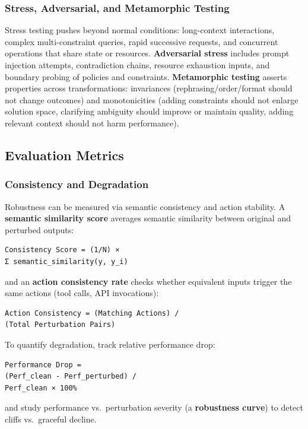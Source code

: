 \begin{TNtwocol}
\subsubsection*{Stress, Adversarial, and Metamorphic Testing}
Stress testing pushes beyond normal conditions: long-context interactions, complex multi-constraint queries, rapid successive requests, and concurrent operations that share state or resources. \textbf{Adversarial stress} includes prompt injection attempts, contradiction chains, resource exhaustion inputs, and boundary probing of policies and constraints. \textbf{Metamorphic testing} asserts properties across transformations: invariances (rephrasing/order/format should not change outcomes) and monotonicities (adding constraints should not enlarge solution space, clarifying ambiguity should improve or maintain quality, adding relevant context should not harm performance).

\subsection*{Evaluation Metrics}

\subsubsection*{Consistency and Degradation}
Robustness can be measured via semantic consistency and action stability. A \textbf{semantic similarity score} averages semantic similarity between original and perturbed outputs:
\begin{verbatim}
Consistency Score = (1/N) × 
Σ semantic_similarity(y, y_i)
\end{verbatim}
and an \textbf{action consistency rate} checks whether equivalent inputs trigger the same actions (tool calls, API invocations):
\begin{verbatim}
Action Consistency = (Matching Actions) / 
(Total Perturbation Pairs)
\end{verbatim}
To quantify degradation, track relative performance drop:
\begin{verbatim}
Performance Drop = 
(Perf_clean - Perf_perturbed) / 
Perf_clean × 100%
\end{verbatim}
and study performance vs.\ perturbation severity (a \textbf{robustness curve}) to detect cliffs vs.\ graceful decline.


\end{TNtwocol}
